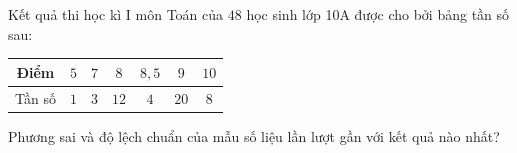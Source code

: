 \begin{ex}
Kết quả thi học kì I môn Toán của $48$ học sinh lớp 10A được cho bởi bảng tần số sau:
\begin{center}
\begin{tabular}{|c|c|c|c|c|c|c|}\hline
Điểm & $5$ & $7$ & $8$ & $8{,}5$ & $9$ & $10$\\\hline
Tần số & $1$ & $3$ & $12$ & $4$ & $20$ & $8$\\\hline
\end{tabular}
\end{center}
Phương sai và độ lệch chuẩn của mẫu số liệu lần lượt gần với kết quả nào nhất?
\end{ex}
